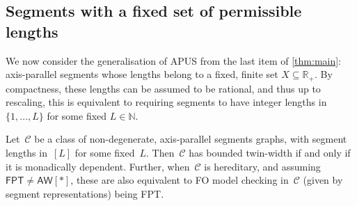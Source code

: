 \documentclass[a4paper,UKenglish,cleveref,thm-restate]{lipics-v2021}
\theoremstyle{remark}
\newcommand{\Cc}{\mathcal{C}}
\newcommand{\N}{\mathbb{N}}
\newcommand{\R}{\mathbb{R}}
\newcommand{\fpt}{\ensuremath{\mathsf{FPT}}\xspace}
\newcommand{\aw}{\ensuremath{\mathsf{AW}[*]}\xspace}
\begin{document}
\subsection{Segments with a fixed set of permissible lengths}
We now consider the generalisation of APUS from the last item of \cref{thm:main}:
axis-parallel segments whose lengths belong to a fixed, finite set $X \subseteq \R_+$.
By compactness, these lengths can be assumed to be rational, and thus up to rescaling,
this is equivalent to requiring segments to have integer lengths in $\{1,\dots,L\}$ for some fixed $L \in \N$.

\begin{theorem}\label{thm:seg-fixed-length-set}
    Let~$\Cc$ be a class of non-degenerate, axis-parallel segments graphs, with segment lengths in~$[L]$ for some fixed~$L$.
    Then~$\Cc$ has bounded twin-width if and only if it is monadically dependent.
    Further, when~$\Cc$ is hereditary, and assuming $\fpt \neq \aw$, these are also equivalent to FO model checking in~$\Cc$ (given by segment representations) being FPT.
\end{theorem}
\end{document}
